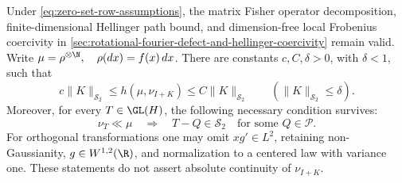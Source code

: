 \begin{proposition}
\label{prop:local-coercivity-with-density-zeros}
Under \eqref{eq:zero-set-row-assumptions}, the matrix Fisher operator decomposition,
finite-dimensional Hellinger path bound, and dimension-free local
Frobenius coercivity in
\cref{sec:rotational-fourier-defect-and-hellinger-coercivity} remain valid.
Write \(\mu=\rho^{\otimes\N},\quad\rho(dx)=f(x)\,dx\).
There are constants \(c,C,\delta>0\), with \(\delta<1\), such that
\begin{equation}
 c\|K\|_{\mathcal S_2}\leq h(\mu,\nu_{I+K})
       \leq C\|K\|_{\mathcal S_2}
 \qquad(\|K\|_{\mathcal S_2}\leq\delta).
 \label{eq:local-hs-bound-with-density-zeros}
\end{equation}
Moreover, for every \(T\in\GL(H)\), the following necessary
condition survives:
\begin{equation}
 \nu_T\ll\mu
 \quad\Longrightarrow\quad
 T-Q\in\mathcal S_2
 \quad\text{for some }Q\in\mathcal P.
 \label{eq:hs-necessity-with-density-zeros}
\end{equation}
For orthogonal transformations one may omit \(xg'\in L^2\),
retaining non-Gaussianity, \(g\in W^{1,2}(\R)\), and normalization to a
centered law with variance one.
These statements do not assert absolute continuity of
\(\nu_{I+K}\).
\end{proposition}
